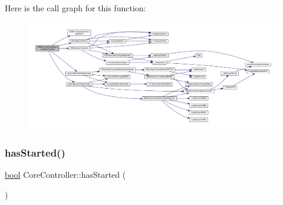 Here is the call graph for this function\+:
\nopagebreak
\begin{figure}[H]
\begin{center}
\leavevmode
\includegraphics[width=350pt]{class_q_g_b_a_1_1_core_controller_aaea9e7a9dc8177cd3f9e778ad81e45af_cgraph}
\end{center}
\end{figure}
\mbox{\label{class_q_g_b_a_1_1_core_controller_a2ca73e2c7b5111edcf3b137651b3cff4}} 
\subsubsection{\texorpdfstring{has\+Started()}{hasStarted()}}
{\footnotesize\ttfamily \mbox{\hyperlink{libretro_8h_a4a26dcae73fb7e1528214a068aca317e}{bool}} Core\+Controller\+::has\+Started (\begin{DoxyParamCaption}{ }\end{DoxyParamCaption})}

